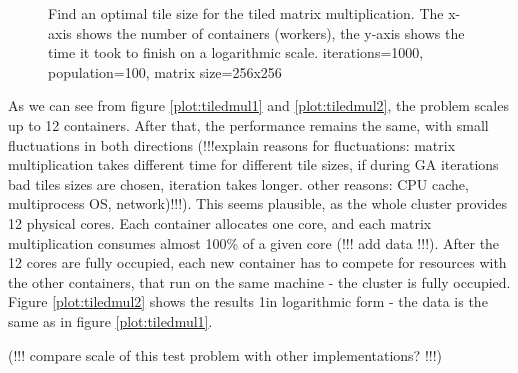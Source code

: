 \documentclass{article}
\begin{document}
\begin{figure}[h]
  \centering
  \caption{Find an optimal tile size for the tiled matrix multiplication. The x-axis shows the number of containers (workers), the y-axis shows the time it took to finish on a logarithmic scale. iterations=1000, population=100, matrix size=256x256}
  \label{plot:tiledmul4}
\end{figure}

As we can see from figure \ref{plot:tiledmul1} and \ref{plot:tiledmul2}, the problem scales up to 12 containers. After that, the performance remains the same, with small fluctuations in both directions (!!!explain reasons for fluctuations: matrix multiplication takes different time for different tile sizes, if during GA iterations bad tiles sizes are chosen, iteration takes longer. other reasons: CPU cache, multiprocess OS, network)!!!). This seems plausible, as the whole cluster provides 12 physical cores. Each container allocates one core, and each matrix multiplication consumes almost 100\% of a given core (!!! add data !!!). After the 12 cores are fully occupied, each new container has to compete for resources with the other containers, that run on the same machine - the cluster is fully occupied. Figure \ref{plot:tiledmul2} shows the results 1in logarithmic form - the data is the same as in figure \ref{plot:tiledmul1}.

(!!! compare scale of this test problem with other implementations? !!!)
\end{document}
